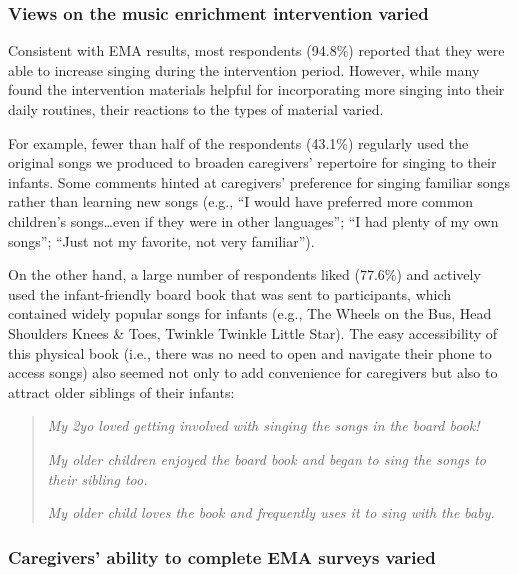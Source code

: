 \documentclass[
]{article}
\begin{document}
\subsubsection*{Views on the music enrichment intervention
varied}\label{views-on-the-music-enrichment-intervention-varied}

Consistent with EMA results, most respondents (94.8\%) reported that
they were able to increase singing during the intervention period.
However, while many found the intervention materials helpful for
incorporating more singing into their daily routines, their reactions to
the types of material varied.

For example, fewer than half of the respondents (43.1\%) regularly used
the original songs we produced to broaden caregivers' repertoire for
singing to their infants. Some comments hinted at caregivers' preference
for singing familiar songs rather than learning new songs (e.g., ``I
would have preferred more common children's songs\ldots even if they
were in other languages''; ``I had plenty of my own songs''; ``Just not
my favorite, not very familiar'').

On the other hand, a large number of respondents liked (77.6\%) and
actively used the infant-friendly board book that was sent to
participants, which contained widely popular songs for infants (e.g.,
The Wheels on the Bus, Head Shoulders Knees \& Toes, Twinkle Twinkle
Little Star). The easy accessibility of this physical book (i.e., there
was no need to open and navigate their phone to access songs) also
seemed not only to add convenience for caregivers but also to attract
older siblings of their infants:

\begin{quote}
\textit{My 2yo loved getting involved with singing the songs in the board book!}
  
\textit{My older children enjoyed the board book and began to sing the songs to their sibling too.}
  
\textit{My older child loves the book and frequently uses it to sing with the baby.}
\end{quote}

\subsubsection*{Caregivers' ability to complete EMA surveys
varied}\label{caregivers-ability-to-complete-ema-surveys-varied}
\end{document}
